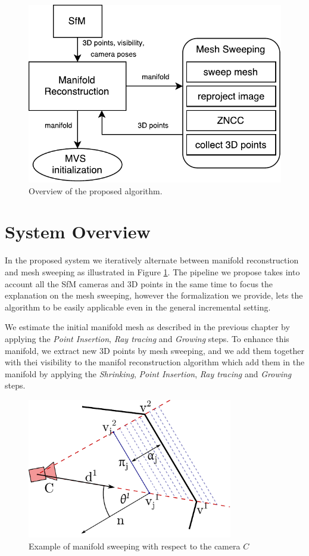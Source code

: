 \begin{figure}[t]
  \centering
  \includegraphics[width=0.9\columnwidth]{./img/ch-sweep/mesh-sweeping_overview}
\caption{Overview of the proposed algorithm.}
  \label{fig:overview}
\end{figure}


\section{System Overview}
\label{sec:overview_sweep}
In the proposed system we iteratively alternate between manifold reconstruction and mesh sweeping as illustrated in Figure \ref{fig:overview}.
The pipeline we propose takes into account all the SfM cameras and 3D points in the same time to focus the explanation on the mesh sweeping, however the formalization we provide, lets the algorithm to be easily applicable even in the general incremental setting.

We estimate the initial manifold mesh as described in the previous chapter by applying the   \emph{Point Insertion}, \emph{Ray tracing} and \emph{Growing} steps.
To enhance this manifold, we extract new 3D points by mesh sweeping, and we add them together with thei visibility to the manifol reconstruction algorithm which add them in the manifold by applying the \emph{Shrinking}, \emph{Point Insertion}, \emph{Ray tracing} and \emph{Growing} steps.


\begin{figure}[tp]
  \centering
  \includegraphics[width=0.8\textwidth]{././img/ch-sweep/sweep.pdf}
  \caption{Example of manifold sweeping with respect to the camera $C$}
  \label{fig:sweep}
\end{figure}


